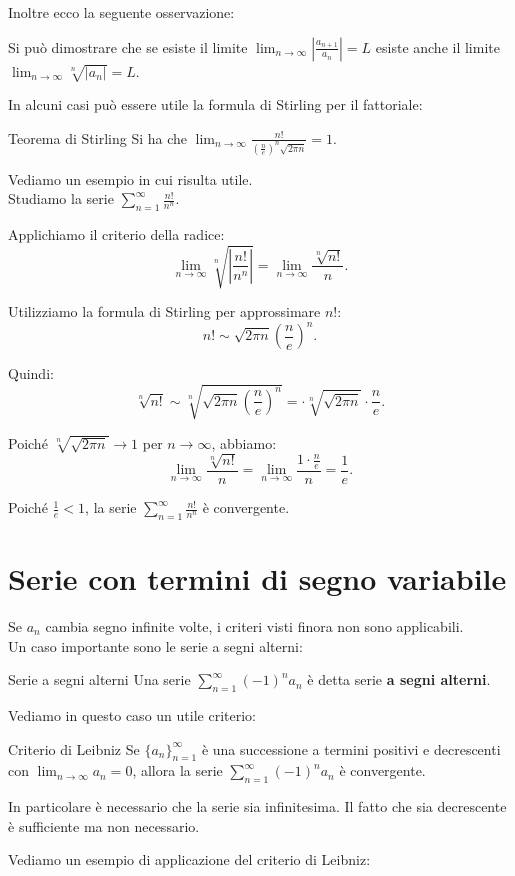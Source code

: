 Inoltre ecco la seguente osservazione:
\begin{osservazione}{}
  Si può dimostrare che se esiste il limite $\lim_{n \to \infty} \left| \frac{a_{n+1}}{a_n} \right| = L$ esiste anche il limite $\lim_{n \to \infty} \sqrt[n]{|a_n|} = L$.
\end{osservazione}

In alcuni casi può essere utile la formula di Stirling per il fattoriale:
\begin{teorema}{Teorema di Stirling}
  Si ha che $\lim_{n \to \infty} \frac{n!}{(\frac{n}{e})^n \sqrt{2\pi n}} = 1$.
\end{teorema}
Vediamo un esempio in cui risulta utile.\\
Studiamo la serie $\sum_{n=1}^{\infty} \frac{n!}{n^n}$.

Applichiamo il criterio della radice:
\[
\lim_{n \to \infty} \sqrt[n]{\left| \frac{n!}{n^n} \right|} = \lim_{n \to \infty} \frac{\sqrt[n]{n!}}{n}.
\]

Utilizziamo la formula di Stirling per approssimare $n!$:
\[
n! \sim \sqrt{2\pi n} \left( \frac{n}{e} \right)^n.
\]

Quindi:
\[
\sqrt[n]{n!} \sim \sqrt[n]{ \sqrt{2\pi n} \left( \frac{n}{e} \right)^n} = \cdot \sqrt[n]{\sqrt{2\pi n}} \cdot \frac{n}{e}.
\]

Poiché $\sqrt[n]{\sqrt{2\pi n}} \to 1$ per $n \to \infty$, abbiamo:
\[
\lim_{n \to \infty} \frac{\sqrt[n]{n!}}{n} = \lim_{n \to \infty} \frac{ 1 \cdot \frac{n}{e}}{n} = \frac{1}{e}.
\]

Poiché $\frac{1}{e} < 1$, la serie $\sum_{n=1}^{\infty} \frac{n!}{n^n}$ è convergente.

\section{Serie con termini di segno variabile}
Se $a_n$ cambia segno infinite volte, i criteri visti finora non sono applicabili.\\
Un caso importante sono le serie a segni alterni:
\begin{definizione}{Serie a segni alterni}
  Una serie $\sum_{n=1}^{\infty} (-1)^n a_n$ è detta serie \textbf{a segni alterni}.
\end{definizione}
Vediamo in questo caso un utile criterio:
\begin{teorema}{Criterio di Leibniz}
  Se $\{a_n\}_{n=1}^{\infty}$ è una successione a termini positivi e decrescenti con $\lim_{n \to \infty} a_n = 0$, allora la serie $\sum_{n=1}^{\infty} (-1)^n a_n$ è convergente.
\end{teorema}
\begin{osservazione}{}
  In particolare è necessario che la serie sia infinitesima. Il fatto che sia decrescente è sufficiente ma non necessario.
\end{osservazione}
Vediamo un esempio di applicazione del criterio di Leibniz:\\

